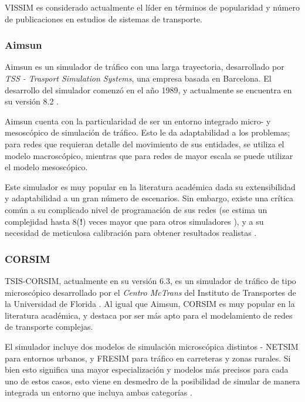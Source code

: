 VISSIM es considerado actualmente el líder en términos de popularidad y número de publicaciones en estudios de sistemas de transporte.

\subsubsection{Aimsun}

Aimsun es un simulador de tráfico con una larga trayectoria, desarrollado por \emph{TSS - Trasport Simulation Systems}, una empresa basada en Barcelona. El desarrollo del simulador comenzó en el año 1989, y actualmente se encuentra en su versión 8.2 \autocite{aimsunweb}.

Aimsun cuenta con la particularidad de ser un entorno integrado micro- y mesoscópico de simulación de tráfico. Esto le da adaptabilidad a los problemas; para redes que requieran detalle del movimiento de sus entidades, se utiliza el modelo macroscópico, mientras que para redes de mayor escala se puede utilizar el modelo mesoscópico.

Este simulador es muy popular en la literatura académica dada su extensibilidad y adaptabilidad a un gran número de escenarios. Sin embargo, existe una crítica común a su complicado nivel de programación de sus redes (se estima un complejidad hasta 8(\textbf{!}) veces mayor que para otros simuladores \autocite{jones2004traffic}), y a su necesidad de meticulosa calibración para obtener resultados realistas \autocite{jones2004traffic,ratrout2009comparative}.

\subsubsection{CORSIM}

TSIS-CORSIM, actualmente en su versión 6.3, es un simulador de tráfico de tipo microscópico desarrollado por el \emph{Centro McTrans} del Instituto de Transportes de la Universidad de Florida \autocite{tsis-corsim}. Al igual que Aimsun, CORSIM es muy popular en la literatura académica, y destaca por ser más apto para el modelamiento de redes de transporte complejas.  

El simulador incluye dos modelos de simulación microscópica distintos - NETSIM para entornos urbanos, y FRESIM para tráfico en carreteras y zonas rurales. Si bien esto significa una mayor especialización y modelos más precisos para cada uno de estos casos, esto viene en desmedro de la posibilidad de simular de manera integrada un entorno que incluya ambas categorías \autocite{jones2004traffic}.


